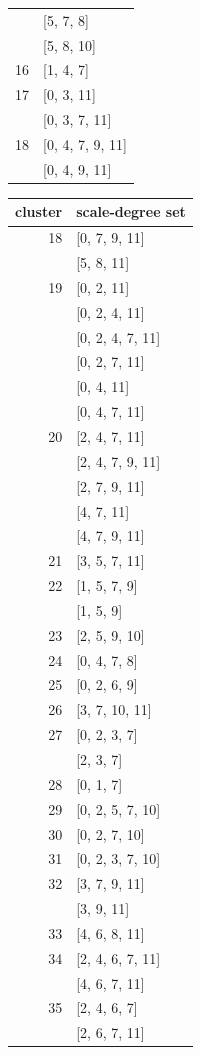 \begin{table}
\begin{multicols}{3}
{\begin{tabular}[t]{r |l }
	&	[5, 7, 8]	\\
	&	[5, 8, 10]	\\
16	&	[1, 4, 7]	\\
17	&	[0, 3, 11]	\\
	&	[0, 3, 7, 11]	\\
18	&	[0, 4, 7, 9, 11]	\\
	&	[0, 4, 9, 11]	\\
\end{tabular}
\vfill
\columnbreak
\begin{tabular}[t]{r |l }
\hline\hline
cluster & scale-degree set\\ [0.5ex]
\hline
18	&	[0, 7, 9, 11]	\\
	&	[5, 8, 11]	\\
19	&	[0, 2, 11]	\\
	&	[0, 2, 4, 11]	\\
	&	[0, 2, 4, 7, 11]	\\
	&	[0, 2, 7, 11]	\\
	&	[0, 4, 11]	\\
	&	[0, 4, 7, 11]	\\
20	&	[2, 4, 7, 11]	\\
	&	[2, 4, 7, 9, 11]	\\
	&	[2, 7, 9, 11]	\\
	&	[4, 7, 11]	\\
	&	[4, 7, 9, 11]	\\
21	&	[3, 5, 7, 11]	\\
22	&	[1, 5, 7, 9]	\\
	&	[1, 5, 9]	\\
23	&	[2, 5, 9, 10]	\\
24	&	[0, 4, 7, 8]	\\
25	&	[0, 2, 6, 9]	\\
26	&	[3, 7, 10, 11]	\\
27	&	[0, 2, 3, 7]	\\
	&	[2, 3, 7]	\\
28	&	[0, 1, 7]	\\
29	&	[0, 2, 5, 7, 10]	\\
30	&	[0, 2, 7, 10]	\\
31	&	[0, 2, 3, 7, 10]	\\
32	&	[3, 7, 9, 11]	\\
	&	[3, 9, 11]	\\
33	&	[4, 6, 8, 11]	\\
34	&	[2, 4, 6, 7, 11]	\\
	&	[4, 6, 7, 11]	\\
35	&	[2, 4, 6, 7]	\\
	&	[2, 6, 7, 11]	\\

\end{tabular}}
\end{multicols}
\end{table}
